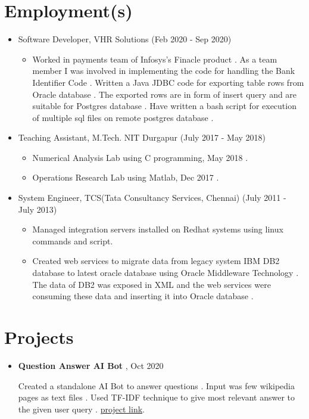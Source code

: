 \documentclass[a4paper,10pt]{article}
\begin{document}
	\section{Employment(s)}
	\begin{itemize}
	        \item Software Developer, VHR Solutions (Feb 2020 - Sep 2020)
                \begin{itemize}
                    \item Worked in payments team of Infosys’s Finacle product . As a team member I was involved in implementing the code for handling the Bank Identifier Code . Written a Java JDBC code for exporting table rows from Oracle database . The exported rows are in form of insert query and are suitable for Postgres database . Have written a bash script for execution of multiple sql files on remote postgres database .
                \end{itemize}
			\item Teaching Assistant, M.Tech. NIT Durgapur (July 2017 - May 2018)
                \begin{itemize}
                    \item Numerical Analysis Lab using C programming, May 2018 .
                    \item Operations Research Lab using Matlab, Dec 2017 .
                \end{itemize}
            \item System Engineer, TCS(Tata Consultancy Services, Chennai) (July 2011 - July 2013)
		        \begin{itemize}
			    	\item Managed integration servers installed on Redhat systems using linux commands and script.
					\item Created web services to migrate data from legacy system IBM DB2 database to latest oracle database using Oracle Middleware Technology .
					The data  of DB2 was exposed in XML  and the web services were consuming these data and inserting it into Oracle database .
			\end{itemize}
	\end{itemize}

	\section{Projects}
	
	\begin{itemize}
		\item \textbf{Question Answer AI Bot} , Oct 2020 
		
		Created a standalone AI Bot to answer questions . Input was few wikipedia pages as text files . Used TF-IDF technique to give most relevant answer to the given user query .
		\href{https://github.com/eelectron/questions}{project link}.  
	\end{itemize}
	
\end{document}

